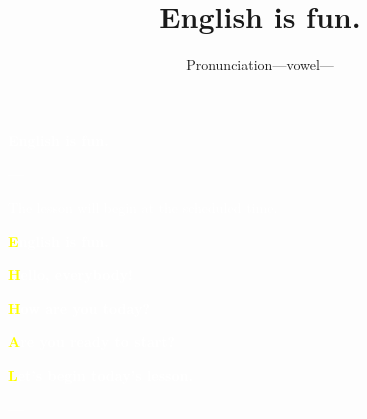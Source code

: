 \documentclass[aspectratio=169,xcolor={dvipsnames,table}]{beamer}
\title{English is fun.}
\subtitle{Pronunciation---vowel---}
\author{}
\institute[]{}
\date[]
\makeatletter
\newcommand*{\themonth}{\two@digits\month}
\newcommand*{\theday}{\two@digits\day}
\newcommand{\mytoday}{{\the\year}--{\themonth}--{\theday}}
\makeatother
\begin{document}
\begin{frame}
\raggedleft
  \textcolor{white}{\Huge\bfseries English is fun.}

\vfill

\raggedleft
 \textcolor{white}{\LARGE\bfseries \mytoday}

\vfill
\vfill
\vfill

\raggedleft
\textcolor{white}{\large The lesson will begin at the scheduled time.}

\end{frame}
\begin{frame}
\raggedleft
  \textcolor{white}{\Huge\bfseries \textcolor{yellow}{E}nglish is fun.}

\vfill

\vfill

\raggedleft
 \textcolor{white}{\LARGE\bfseries \textcolor{yellow}{H}ello, everybody!}

 \textcolor{white}{\LARGE\bfseries \textcolor{yellow}{H}ow are you today?}

\raggedleft
 \textcolor{white}{\LARGE\bfseries \textcolor{yellow}{A}re you ready to start?}

 \textcolor{white}{\LARGE\bfseries \textcolor{yellow}{L}et's begin today's lesson.}

\vfill

\raggedleft
 \textcolor{white}{\Large \bfseries \mytoday}



\hyperlink{today}{}%
\end{frame}
\end{document}
